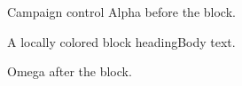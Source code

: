 \documentclass[11pt,aspectratio=169]{beamer}
\date{}
\begin{document}
\begin{frame}{Campaign control}
Alpha before the block.
\begin{block}{A locally colored block heading}Body text.\end{block}
Omega after the block.
\end{frame}
\end{document}
